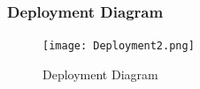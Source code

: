 \documentclass[11pt]{article}
\begin{document}
\subsubsection{Deployment Diagram}
\begin{figure}[h]
 \centering
 \texttt{[image: Deployment2.png]}
 \caption{Deployment Diagram}
 \label{DeploymentDiagram}
\end{figure}
\end{document}

